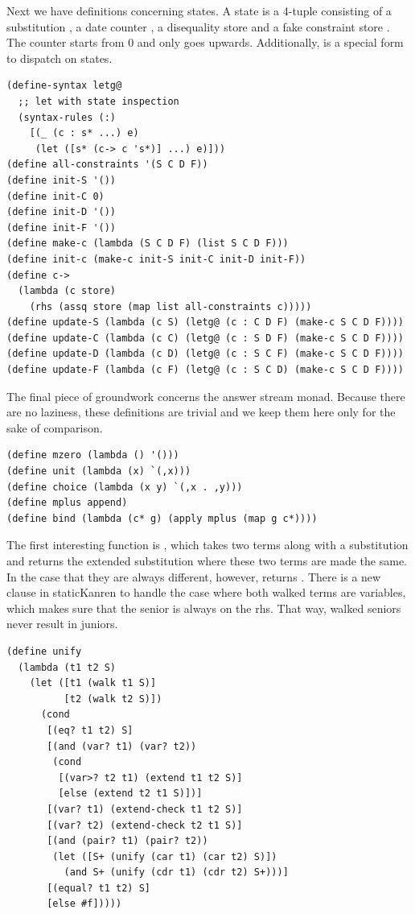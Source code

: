 Next we have definitions concerning states. A state is a 4-tuple consisting of a substitution , a date counter , a disequality store  and a fake constraint store . The counter starts from 0 and only goes upwards. Additionally,  is a special form to dispatch on states.
\begin{lstlisting}
(define-syntax letg@
  ;; let with state inspection
  (syntax-rules (:)
    [(_ (c : s* ...) e)
     (let ([s* (c-> c 's*)] ...) e)]))
(define all-constraints '(S C D F))
(define init-S '())
(define init-C 0)
(define init-D '())
(define init-F '())
(define make-c (lambda (S C D F) (list S C D F)))
(define init-c (make-c init-S init-C init-D init-F))
(define c->
  (lambda (c store)
    (rhs (assq store (map list all-constraints c)))))
(define update-S (lambda (c S) (letg@ (c : C D F) (make-c S C D F))))
(define update-C (lambda (c C) (letg@ (c : S D F) (make-c S C D F))))
(define update-D (lambda (c D) (letg@ (c : S C F) (make-c S C D F))))
(define update-F (lambda (c F) (letg@ (c : S C D) (make-c S C D F))))
\end{lstlisting}

The final piece of groundwork concerns the answer stream monad. Because there are no laziness, these definitions are trivial and we keep them here only for the sake of comparison.
\begin{lstlisting}
(define mzero (lambda () '()))
(define unit (lambda (x) `(,x)))
(define choice (lambda (x y) `(,x . ,y)))
(define mplus append)
(define bind (lambda (c* g) (apply mplus (map g c*))))
\end{lstlisting}

The first interesting function is , which takes two terms along with a substitution and returns the extended substitution where these two terms are made the same. In the case that they are always different, however,  returns . There is a new clause in staticKanren to handle the case where both walked terms are variables, which makes sure that the senior is always on the rhs. That way, walked seniors never result in juniors.
\begin{lstlisting}
(define unify
  (lambda (t1 t2 S)
    (let ([t1 (walk t1 S)]
          [t2 (walk t2 S)])
      (cond
       [(eq? t1 t2) S]
       [(and (var? t1) (var? t2))
        (cond
         [(var>? t2 t1) (extend t1 t2 S)]
         [else (extend t2 t1 S)])]
       [(var? t1) (extend-check t1 t2 S)]
       [(var? t2) (extend-check t2 t1 S)]
       [(and (pair? t1) (pair? t2))
        (let ([S+ (unify (car t1) (car t2) S)])
          (and S+ (unify (cdr t1) (cdr t2) S+)))]
       [(equal? t1 t2) S]
       [else #f]))))
\end{lstlisting}

